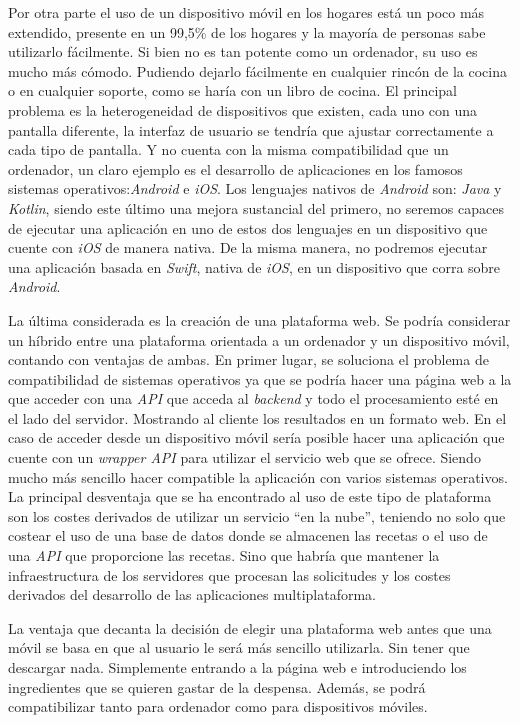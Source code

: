 Por otra parte el uso de un dispositivo móvil en los hogares está un poco más extendido, presente en un 99,5\% de los hogares y la mayoría de personas sabe utilizarlo fácilmente.\cite{ontsi2022} Si bien no es tan potente como un ordenador, su uso es mucho más cómodo. Pudiendo dejarlo fácilmente en cualquier rincón de la cocina o en cualquier soporte, como se haría con un libro de cocina. El principal problema es la heterogeneidad de dispositivos que existen, cada uno con una pantalla diferente, la interfaz de usuario se tendría que ajustar correctamente a cada tipo de pantalla. Y no cuenta con la misma compatibilidad que un ordenador, un claro ejemplo es el desarrollo de aplicaciones en los famosos sistemas operativos:\emph{Android} e \emph{iOS}. Los lenguajes nativos de \emph{Android} son: \emph{Java} y \emph{Kotlin}, siendo este último una mejora sustancial del primero, no seremos capaces de ejecutar una aplicación en uno de estos dos lenguajes en un dispositivo que cuente con \emph{iOS} de manera nativa. De la misma manera, no podremos ejecutar una aplicación basada en \emph{Swift}, nativa de \emph{iOS}, en un dispositivo que corra sobre \emph{Android}.

La última considerada es la creación de una plataforma web. Se podría considerar un híbrido entre una plataforma orientada a un ordenador y un dispositivo móvil, contando con ventajas de ambas. En primer lugar, se soluciona el problema de compatibilidad de sistemas operativos ya que se podría hacer una página web a la que acceder con una \emph{API} que acceda al \emph{backend} y todo el procesamiento esté en el lado del servidor. Mostrando al cliente los resultados en un formato web. En el caso de acceder desde un dispositivo móvil sería posible hacer una aplicación que cuente con un \emph{wrapper API} para utilizar el servicio web que se ofrece. Siendo mucho más sencillo hacer compatible la aplicación con varios sistemas operativos. La principal desventaja que se ha encontrado al uso de este tipo de plataforma son los costes derivados de utilizar un servicio ``en la nube'', teniendo no solo que costear el uso de una base de datos donde se almacenen las recetas o el uso de una \emph{API} que proporcione las recetas. Sino que habría que mantener la infraestructura de los servidores que procesan las solicitudes y los costes derivados del desarrollo de las aplicaciones multiplataforma.

La ventaja que decanta la decisión de elegir una plataforma web antes que una móvil se basa en que al usuario le será más sencillo utilizarla. Sin tener que descargar nada. Simplemente entrando a la página web e introduciendo los ingredientes que se quieren gastar de la despensa. Además, se podrá compatibilizar tanto para ordenador como para dispositivos móviles.

